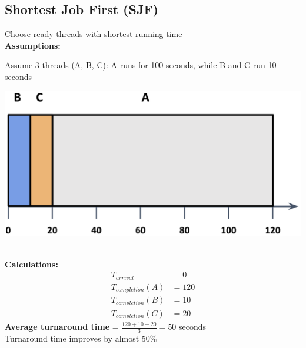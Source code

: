 \documentclass[../../compsys.tex]{subfiles}
\begin{document}
\subsection{Shortest Job First (SJF)}
Choose ready threads with shortest running time\\
\textbf{Assumptions:}\\[5px]
\begin{minipage}[htp]{0.5\textwidth}   
Assume 3 threads (A, B, C): A runs for 100 seconds, while B and C run 10 seconds
\end{minipage}
\hfill
\begin{minipage}[htp]{0.45\textwidth}
    \centering
    \includegraphics[width=1\textwidth]{images/sjf.png}
\end{minipage}\\[5px]
\textbf{Calculations:}\\[5px]
\begin{align*}
    T_{arrival} &= 0 \\
    T_{completion}(A) &= 120 \\
    T_{completion}(B) &= 10 \\
    T_{completion}(C) &= 20
\end{align*}
\textbf{Average turnaround time} = $\frac{120 + 10 + 20}{3} = 50$ seconds \\[3px]
Turnaround time improves by almost 50\%
\end{document}
